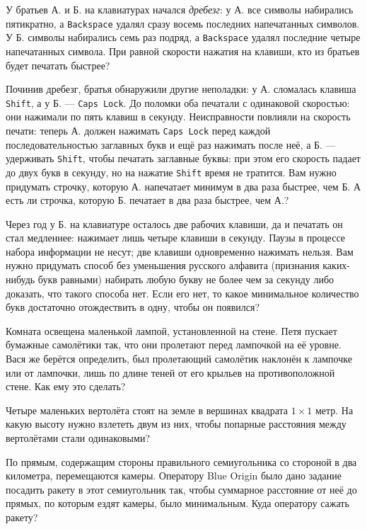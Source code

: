 \begin{itemize}
\itA У братьев А. и Б. на клавиатурах начался {\it дребезг}: у А. все символы набирались пятикратно, а {\tt Backspace} удалял сразу восемь последних напечатанных символов. У Б. символы набирались семь раз подряд, а {\tt Backspace} удалял последние четыре напечатанных символа. При равной скорости нажатия на клавиши, кто из братьев будет печатать быстрее?

\itB Починив дребезг, братья обнаружили другие неполадки: у А. сломалась клавиша {\tt Shift}, а у Б. — {\tt Caps Lock}. До поломки оба печатали с одинаковой скоростью: они нажимали по пять клавиш в секунду. Неисправности повлияли на скорость печати: теперь А. должен нажимать {\tt Caps Lock} перед каждой последовательностью заглавных букв и ещё раз нажимать после неё, а Б. — удерживать {\tt Shift}, чтобы печатать заглавные буквы: при этом его скорость падает до двух букв в секунду, но на нажатие {\tt Shift} время не тратится. Вам нужно придумать строчку, которую А. напечатает минимум в два раза быстрее, чем Б. А есть ли строчка, которую Б. печатает в два раза быстрее, чем А.?

\itC Через год у Б. на клавиатуре осталось две рабочих клавиши, да и печатать он стал медленнее: нажимает лишь четыре клавиши в секунду. Паузы в процессе набора информации не несут; две клавиши одновременно нажимать нельзя. Вам нужно придумать способ без уменьшения русского алфавита (признания каких-нибудь букв равными) набирать любую букву не более чем за секунду либо доказать, что такого способа нет. Если его нет, то какое минимальное количество букв достаточно отождествить в одну, чтобы он появился?
\end{itemize}

\begin{itemize}
\itA Комната освещена маленькой лампой, установленной на стене. Петя пускает бумажные самолётики так, что они пролетают перед лампочкой на её уровне. Вася же берётся определить, был пролетающий самолётик наклонён к лампочке или от лампочки, лишь по длине теней от его крыльев на противоположной стене. Как ему это сделать?

\itB Четыре маленьких вертолёта стоят на земле в вершинах квадрата $1 \times 1$ метр. На какую высоту нужно взлететь двум из них, чтобы попарные расстояния между вертолётами стали одинаковыми?

\itC По прямым, содержащим стороны правильного семиугольника со стороной в два километра, перемещаются камеры. Оператору Blue Origin было дано задание посадить ракету в этот семиугольник так, чтобы суммарное расстояние от неё до прямых, по которым ездят камеры, было минимальным. Куда оператору сажать ракету?
\end{itemize}

